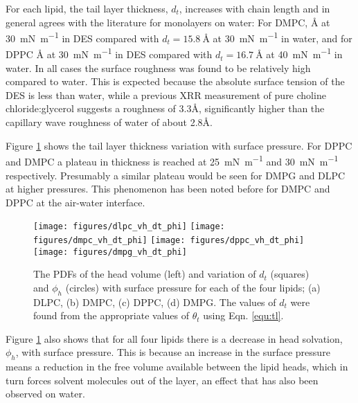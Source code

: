 \documentclass[amsmath,amssymb,twocolumn]{revtex4-1}
\begin{document}
For each lipid, the tail layer thickness, $d_t$, increases with chain length
and in general agrees with the literature for monolayers on
water\cite{Mohwald1990,Vaknin1991}:
For DMPC, \si{\angstrom} at
\SI{30}{\milli\newton\per\meter} in DES compared with
$d_t=\SI{15.8}{\angstrom}$ at
\SI{30}{\milli\newton\per\meter}\cite{Johnson1991} in water, and for
DPPC \si{\angstrom} at
\SI{30}{\milli\newton\per\meter} in DES compared with
$d_t=\SI{16.7}{\angstrom}$ at
\SI{40}{\milli\newton\per\meter}\cite{Helm1987} in water.
In all cases the surface roughness was found to be relatively high compared
to water.
This is expected because the absolute surface tension of the DES is less
than water, while a previous XRR measurement of pure choline
chloride:glycerol suggests a roughness of
3.3\si{\angstrom}\cite{Sanchez-Fernandez2016}, significantly higher than
the capillary wave roughness of water of about 2.8\si{\angstrom}.

Figure \ref{fig:lipresults} shows the tail layer thickness variation with
surface pressure. For DPPC and DMPC a plateau in thickness is reached at
\SI{25}{\milli\newton\per\meter} and \SI{30}{\milli\newton\per\meter}
respectively. Presumably a similar plateau would be seen for DMPG and DLPC
at higher pressures.
This phenomenon has been noted before for DMPC\cite{Bayerl1990} and
DPPC\cite{Campbell2018} at the air-water interface.
%
\begin{figure}
	\centering
  \texttt{[image: figures/dlpc\_vh\_dt\_phi]}
	\texttt{[image: figures/dmpc\_vh\_dt\_phi]}
	\texttt{[image: figures/dppc\_vh\_dt\_phi]}
	\texttt{[image: figures/dmpg\_vh\_dt\_phi]}
	\caption{\small The PDFs of the head volume (left) and variation of
  $d_t$ (squares) and $\phi_h$ (circles) with surface pressure for each of
  the four lipids; (a) DLPC, (b) DMPC, (c) DPPC, (d) DMPG. The values of
  $d_t$ were found from the appropriate values of $\theta_t$ using
  Eqn. \ref{equ:tl}.}
	\label{fig:lipresults}
\end{figure}
%

Figure \ref{fig:lipresults} also shows that for all four lipids there is a
decrease in head solvation, $\phi_h$, with surface pressure.
This is because an increase in the surface pressure means a reduction in the
free volume available between the lipid heads, which in turn forces solvent
molecules out of the layer, an effect that has also been observed on
water\cite{Bayerl1990}.
\end{document}
